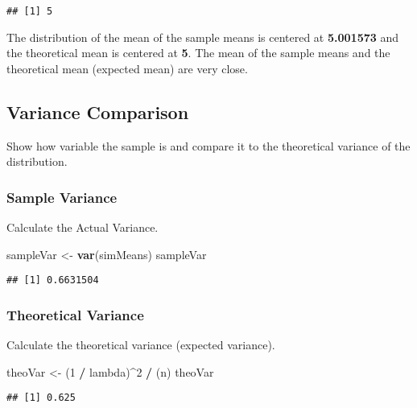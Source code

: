\documentclass[]{article}
\newenvironment{Shaded}{\begin{snugshade}}{\end{snugshade}}
\newcommand{\KeywordTok}[1]{\textcolor[rgb]{0.13,0.29,0.53}{\textbf{#1}}}
\newcommand{\DecValTok}[1]{\textcolor[rgb]{0.00,0.00,0.81}{#1}}
\newcommand{\StringTok}[1]{\textcolor[rgb]{0.31,0.60,0.02}{#1}}
\newcommand{\OperatorTok}[1]{\textcolor[rgb]{0.81,0.36,0.00}{\textbf{#1}}}
\newcommand{\NormalTok}[1]{#1}
\begin{document}
\begin{verbatim}
## [1] 5
\end{verbatim}

The distribution of the mean of the sample means is centered at
\textbf{5.001573} and the theoretical mean is centered at \textbf{5}.
The mean of the sample means and the theoretical mean (expected mean)
are very close.

\subsection{Variance Comparison}\label{variance-comparison}

Show how variable the sample is and compare it to the theoretical
variance of the distribution.

\subsubsection{Sample Variance}\label{sample-variance}

Calculate the Actual Variance.

\begin{Shaded}
\begin{Highlighting}[]
\NormalTok{sampleVar <-}\StringTok{ }\KeywordTok{var}\NormalTok{(simMeans)}
\NormalTok{sampleVar}
\end{Highlighting}
\end{Shaded}

\begin{verbatim}
## [1] 0.6631504
\end{verbatim}

\subsubsection{Theoretical Variance}\label{theoretical-variance}

Calculate the theoretical variance (expected variance).

\begin{Shaded}
\begin{Highlighting}[]
\NormalTok{theoVar  <-}\StringTok{ }\NormalTok{(}\DecValTok{1} \OperatorTok{/}\StringTok{ }\NormalTok{lambda)}\OperatorTok{^}\DecValTok{2} \OperatorTok{/}\StringTok{ }\NormalTok{(n) }
\NormalTok{theoVar}
\end{Highlighting}
\end{Shaded}

\begin{verbatim}
## [1] 0.625
\end{verbatim}
\end{document}
